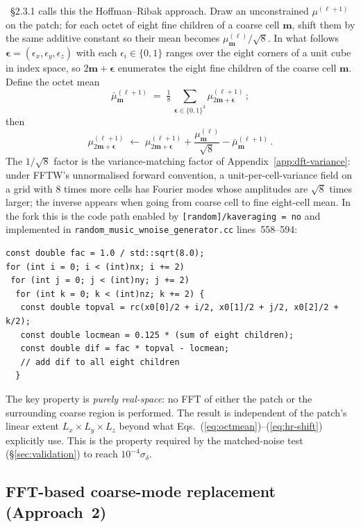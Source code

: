 \documentclass[12pt]{article}
\newcommand{\bm}{\mathbf{m}}
\newcommand{\code}[1]{\texttt{#1}}
\begin{document}
\citet{Hahn2011}~\S2.3.1 calls this the Hoffman--Ribak approach.
Draw an unconstrained $\mu^{(\ell+1)}$ on the patch; for each octet
of eight fine children of a coarse cell $\bm$, shift them by the
same additive constant so their mean becomes
$\mu^{(\ell)}_\bm / \sqrt{8}$.  In what follows
$\boldsymbol\epsilon = (\epsilon_x, \epsilon_y, \epsilon_z)$ with
each $\epsilon_i \in \{0,1\}$ ranges over the eight corners of a
unit cube in index space, so $2\bm + \boldsymbol\epsilon$
enumerates the eight fine children of the coarse cell $\bm$.
Define the octet mean
\begin{equation}
  \bar\mu^{(\ell+1)}_\bm \;=\; \tfrac{1}{8}\,\sum_{\boldsymbol\epsilon \in \{0,1\}^3}
          \mu^{(\ell+1)}_{2\bm + \boldsymbol\epsilon}\,;
  \label{eq:octmean}
\end{equation}
then
\begin{equation}
  \mu^{(\ell+1)}_{2\bm + \boldsymbol\epsilon} \;\leftarrow\;
        \mu^{(\ell+1)}_{2\bm + \boldsymbol\epsilon}
        + \frac{\mu^{(\ell)}_\bm}{\sqrt{8}}
        - \bar\mu^{(\ell+1)}_\bm\,.
  \label{eq:hr-shift}
\end{equation}
The $1/\sqrt{8}$ factor is the variance-matching factor of
Appendix~\ref{app:dft-variance}: under FFTW's unnormalised forward
convention, a unit-per-cell-variance field on a grid with 8 times
more cells has Fourier modes whose amplitudes are $\sqrt{8}$ times
larger; the inverse appears when going from coarse cell to fine
eight-cell mean.  In the fork this is the code path enabled by
\code{[random]/kaveraging = no} and implemented in
\code{random\_music\_wnoise\_generator.cc} lines~558--594:
\begin{lstlisting}
const double fac = 1.0 / std::sqrt(8.0);
for (int i = 0; i < (int)nx; i += 2)
 for (int j = 0; j < (int)ny; j += 2)
  for (int k = 0; k < (int)nz; k += 2) {
   const double topval = rc(x0[0]/2 + i/2, x0[1]/2 + j/2, x0[2]/2 + k/2);
   const double locmean = 0.125 * (sum of eight children);
   const double dif = fac * topval - locmean;
   // add dif to all eight children
  }
\end{lstlisting}
The key property is \emph{purely real-space}: no FFT of either the
patch or the surrounding coarse region is performed.  The result is
independent of the patch's linear extent
$L_x \times L_y \times L_z$ beyond what
Eqs.~(\ref{eq:octmean})--(\ref{eq:hr-shift}) explicitly use.  This
is the property required by the matched-noise test
(\S\ref{sec:validation}) to reach $10^{-4}\sigma_\delta$.

\subsection{FFT-based coarse-mode replacement (Approach~2)}
\label{sec:noise-approach2}
\end{document}
